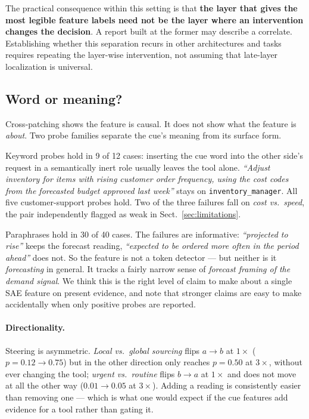 \documentclass{article}
\begin{document}
The practical consequence within this setting is that \textbf{the layer that gives the most legible feature labels need not be the layer where an intervention changes the decision}. A report built at the former may describe a correlate. Establishing whether this separation recurs in other architectures and tasks requires repeating the layer-wise intervention, not assuming that late-layer localization is universal.

\subsection{Word or meaning?}
\label{sec:semantics}

Cross-patching shows the feature is causal. It does not show what the feature is \emph{about}. Two probe families separate the cue's meaning from its surface form.

Keyword probes hold in 9 of 12 cases: inserting the cue word into the other side's request in a semantically inert role usually leaves the tool alone. \emph{``Adjust inventory for items with rising customer order frequency, using the cost codes from the forecasted budget approved last week''} stays on \texttt{inventory\_manager}. All five customer-support probes hold. Two of the three failures fall on \emph{cost vs.\ speed}, the pair independently flagged as weak in Sect.~\ref{sec:limitations}.

Paraphrases hold in 30 of 40 cases. The failures are informative: \emph{``projected to rise''} keeps the forecast reading, \emph{``expected to be ordered more often in the period ahead''} does not. So the feature is not a token detector --- but neither is it \emph{forecasting} in general. It tracks a fairly narrow sense of \emph{forecast framing of the demand signal}. We think this is the right level of claim to make about a single SAE feature on present evidence, and note that stronger claims are easy to make accidentally when only positive probes are reported.

\paragraph{Directionality.} Steering is asymmetric. \emph{Local vs.\ global sourcing} flips $a \to b$ at $1\times$ ($p = 0.12 \to 0.75$) but in the other direction only reaches $p = 0.50$ at $3\times$, without ever changing the tool; \emph{urgent vs.\ routine} flips $b \to a$ at $1\times$ and does not move at all the other way ($0.01 \to 0.05$ at $3\times$). Adding a reading is consistently easier than removing one --- which is what one would expect if the cue features add evidence for a tool rather than gating it.
\end{document}
